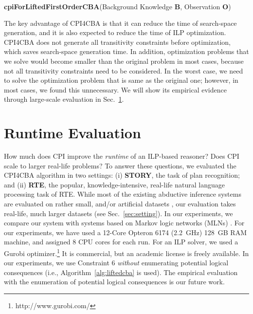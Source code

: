 \documentclass[english]{jnlp_1.4}
\begin{document}
\begin{algorithm}[b]
  \caption{\textbf{cpiForLiftedFirstOrderCBA}(Background Knowledge $\mathbf{B}$, Observation $\mathbf{O}$)}
  \label{alg:cpi4cba}

\end{algorithm}

The key advantage of CPI4CBA is that it can reduce the time of search-space
generation, and it is also expected to reduce the time of ILP optimization.
CPI4CBA does not generate all transitivity constraints before optimization,
which saves search-space generation time. In addition, optimization problems
that we solve would become smaller than the original problem in most cases,
because not all transitivity constraints need to be
considered. In the worst case, we need to solve the optimization problem that is
same as the original one; however, in most cases, we found this unnecessary.
We will show its empirical evidence through large-scale evaluation in
Sec.~\ref{sec:eval}.




\section{Runtime Evaluation}
\label{sec:eval}

How much does CPI improve the \emph{runtime} of an ILP-based reasoner?
Does CPI scale to larger real-life problems? To answer these
questions, we evaluated the CPI4CBA algorithm in two settings: (i)
\textbf{STORY}, the task of plan recognition; and (ii) \textbf{RTE},
the popular, knowledge-intensive, real-life natural language
processing task of RTE. While
most of the existing abductive inference systems are evaluated on
rather small, and/or artificial datasets
\cite[etc.]{Kate09,Raghavan10,Singla11}, our evaluation takes
real-life, much larger datasets (see Sec.~\ref{sec:setting}). In our
experiments, we compare our system with systems
\cite{Kate09,Singla11,Blythe11} based on Markov logic networks (MLNs)
\cite{Richardson06}. For our experiments, we have used a 12-Core
Opteron 6174 (2.2~GHz) 128~GB RAM machine, and assigned 8 CPU cores for
each run. For an ILP solver, we used a Gurobi
optimizer.\footnote{http://www.gurobi.com/} It is commercial, but an
academic license is freely
available. In our experiments, we use Constraint 6 \emph{without}
enumerating potential logical consequences (i.e., Algorithm~\ref{alg:liftedcba}
is used). The empirical evaluation with the enumeration of potential logical
consequences is our future work.
\end{document}

